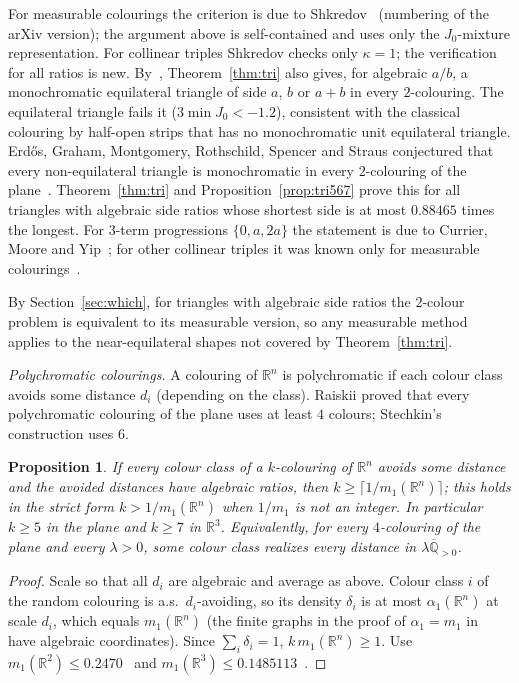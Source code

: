 \documentclass[11pt]{amsart}
\newtheorem{proposition}[theorem]{Proposition}
\theoremstyle{definition}
\newcommand{\R}{\mathbb{R}}
\begin{document}
For measurable colourings the criterion is due to Shkredov~\cite[Theorems 1, 6, 9]{Shkredov} (numbering of the arXiv version); the argument above is self-contained and uses only the $J_0$-mixture representation. For collinear triples Shkredov checks only $\kappa=1$; the verification for all ratios is new. By~\cite[Theorem 1]{EGMRSS3}, Theorem~\ref{thm:tri} also gives, for algebraic $a/b$, a monochromatic equilateral triangle of side $a$, $b$ or $a+b$ in every $2$-colouring. The equilateral triangle fails it ($3\min J_0<-1.2$), consistent with the classical colouring by half-open strips that has no monochromatic unit equilateral triangle. Erd\H{o}s, Graham, Montgomery, Rothschild, Spencer and Straus conjectured that every non-equilateral triangle is monochromatic in every $2$-colouring of the plane~\cite[Problem \#173]{EP173}. Theorem~\ref{thm:tri} and Proposition~\ref{prop:tri567} prove this for all triangles with algebraic side ratios whose shortest side is at most $0.88465$ times the longest. For $3$-term progressions $\{0,a,2a\}$ the statement is due to Currier, Moore and Yip~\cite{CMY}; for other collinear triples it was known only for measurable colourings~\cite{Shkredov}.

By Section~\ref{sec:which}, for triangles with algebraic side ratios the $2$-colour problem is equivalent to its measurable version, so any measurable method applies to the near-equilateral shapes not covered by Theorem~\ref{thm:tri}.

\emph{Polychromatic colourings.} A colouring of $\R^n$ is polychromatic if each colour class avoids some distance $d_i$ (depending on the class). Raiskii proved that every polychromatic colouring of the plane uses at least $4$ colours; Stechkin's construction uses $6$.

\begin{proposition}\label{prop:poly}
If every colour class of a $k$-colouring of $\R^n$ avoids some distance and the avoided distances have algebraic ratios, then $k\ge\lceil1/m_1(\R^n)\rceil$; this holds in the strict form $k>1/m_1(\R^n)$ when $1/m_1$ is not an integer. In particular $k\ge5$ in the plane and $k\ge7$ in $\R^3$. Equivalently, for every $4$-colouring of the plane and every $\lambda>0$, some colour class realizes every distance in $\lambda\overline{\mathbb Q}_{>0}$.
\end{proposition}

\begin{proof}
Scale so that all $d_i$ are algebraic and average as above. Colour class $i$ of the random colouring is a.s.\ $d_i$-avoiding, so its density $\delta_i$ is at most $\alpha_1(\R^n)$ at scale $d_i$, which equals $m_1(\R^n)$ (the finite graphs in the proof of $\alpha_1=m_1$ in~\cite{BassR3} have algebraic coordinates). Since $\sum_i\delta_i=1$, $k\,m_1(\R^n)\ge1$. Use $m_1(\R^2)\le0.2470$~\cite{ACMVZ} and $m_1(\R^3)\le0.1485113$~\cite{BassR3}.
\end{proof}
\end{document}
